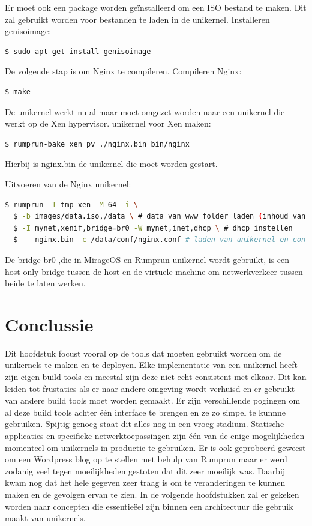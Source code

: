 \documentclass[pdftex,a4paper,12pt,twoside]{report}
\begin{document}
Er moet ook een package worden geïnstalleerd om een ISO bestand te maken. Dit zal gebruikt worden voor bestanden te laden in de unikernel.
\noindent Installeren genisoimage:
\begin{lstlisting}[language=bash]
  $ sudo apt-get install genisoimage
\end{lstlisting}

De volgende stap is om Nginx te compileren.
\noindent Compileren Nginx:
\begin{lstlisting}[language=bash]
  $ make
\end{lstlisting}

De unikernel werkt nu al maar moet omgezet worden naar een unikernel die werkt op de Xen hypervisor.
\noindent unikernel voor Xen maken:
\begin{lstlisting}[language=bash]
  $ rumprun-bake xen_pv ./nginx.bin bin/nginx
\end{lstlisting}

Hierbij is nginx.bin de unikernel die moet worden gestart.

\noindent Uitvoeren van de Nginx unikernel:
\begin{lstlisting}[language=bash]
  $ rumprun -T tmp xen -M 64 -i \
  $ -b images/data.iso,/data \ # data van www folder laden (inhoud van statische website)
  $ -I mynet,xenif,bridge=br0 -W mynet,inet,dhcp \ # dhcp instellen
  $ -- nginx.bin -c /data/conf/nginx.conf # laden van unikernel en configuratie
\end{lstlisting}

De bridge br0 ,die in MirageOS en Rumprun unikernel wordt gebruikt, is een host-only bridge tussen de host en de virtuele machine om netwerkverkeer tussen beide te laten werken.

\section{Conclussie}

Dit hoofdstuk focust vooral op de tools dat moeten gebruikt worden om de unikernels te maken en te deployen. Elke implementatie van een unikernel heeft zijn eigen build tools en meestal zijn deze niet echt consistent met elkaar. Dit kan leiden tot frustaties als er naar andere omgeving wordt verhuisd en er gebruikt van andere build tools moet worden gemaakt. Er zijn verschillende pogingen om al deze build tools achter één interface te brengen en ze zo simpel te kunnne gebruiken. Spijtig genoeg staat dit alles nog in een vroeg stadium. Statische applicaties en specifieke netwerktoepassingen zijn één van de enige mogelijkheden momenteel om unikernels in productie te gebruiken. Er is ook geprobeerd geweest om een Wordpress blog op te stellen met behulp van Rumprun maar er werd zodanig veel tegen moeilijkheden gestoten dat dit zeer moeilijk was. Daarbij kwam nog dat het hele gegeven zeer traag is om te veranderingen te kunnen maken en de gevolgen ervan te zien. In de volgende hoofdstukken zal er gekeken worden naar concepten die essentieëel zijn binnen een architectuur die gebruik maakt van unikernels.
\end{document}
